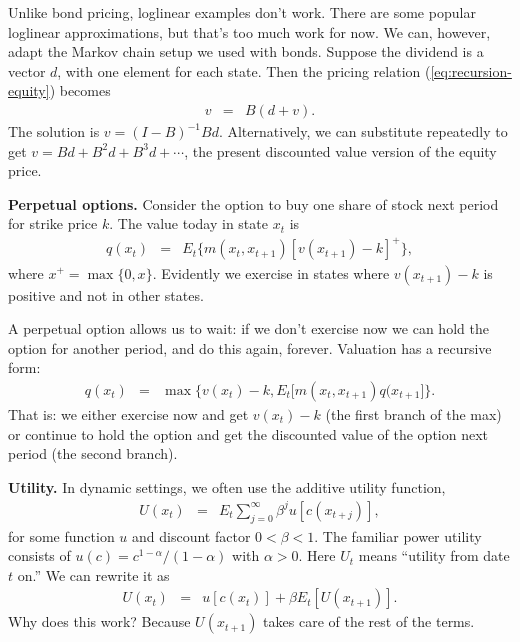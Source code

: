 \documentclass[11pt]{article}
\begin{document}
Unlike bond pricing, loglinear examples don't work.
There are some popular loglinear approximations, but that's too much work for now.
We can, however, adapt the Markov chain setup we used with bonds.
Suppose the dividend is a vector $d$, with one element for each state.
Then the pricing relation (\ref{eq:recursion-equity}) becomes
\begin{eqnarray*}
    v &=& B (d+v) .
\end{eqnarray*}
The solution is $ v = (I-B)^{-1} B d$.
Alternatively, we can substitute repeatedly to get
$ v = B d + B^2 d + B^3 d + \cdots $,
the present discounted value version of the equity price.


{\bf Perpetual options.\/}
Consider the option to buy one share of stock next period for strike price $k$.
The value today in state $x_t$ is
\begin{eqnarray*}
    q(x_t) &=& E_t \big\{ m(x_t,x_{t+1}) [v(x_{t+1}) - k]^+ \big\} ,
\end{eqnarray*}
where $x^+ = \max \{0, x \} $.
Evidently we exercise in states where $ v(x_{t+1}) - k$ is positive
and not in other states.

A perpetual option allows us to wait:  if we don't exercise now
we can hold the option for another period, and do this again, forever.
Valuation has a recursive form:
\begin{eqnarray*}
    q(x_t) &=& \max \big\{ v(x_{t}) - k, E_t \big[ m(x_t,x_{t+1}) q(x_{t+1}\big] \big\} .
\end{eqnarray*}
That is:  we either exercise now and get $v(x_t)-k$ (the first branch
of the max) or continue to hold the option and get the discounted value of the option
next period (the second branch).



{\bf Utility.\/}
In dynamic settings, we often use the additive utility function,
\begin{eqnarray*}
    U(x_t) &=& E_t \sum_{j=0}^\infty \beta^j u[c(x_{t+j})] ,
\end{eqnarray*}
for some function $u$ and discount factor $ 0 < \beta < 1 $.
The familiar power utility consists of $u(c) = c^{1-\alpha}/(1-\alpha)$ with $\alpha > 0$.
Here $U_t$ means ``utility from date $t$ on.''
We can rewrite it as
\begin{eqnarray*}
    U(x_t) &=&  u[c(x_{t})] + \beta E_t [U(x_{t+1})]  .
\end{eqnarray*}
Why does this work?  Because $U(x_{t+1})$ takes care of the rest of the terms.
\end{document}
